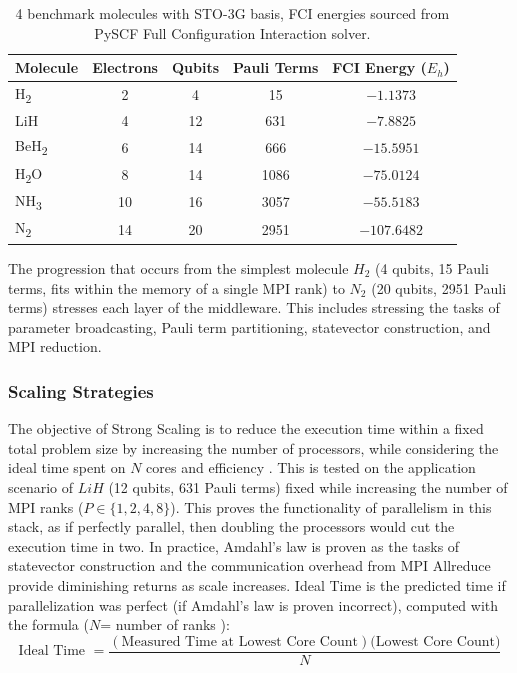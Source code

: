 \begin{table}[htbp]
\centering
\renewcommand{\arraystretch}{1.2}
\begin{tabular}{|l|c|c|c|c|}
\hline
\textbf{Molecule} & \textbf{Electrons} & \textbf{Qubits} & \textbf{Pauli Terms} & \textbf{FCI Energy ($E_h$)} \\ \hline
H\textsubscript{2} & 2  & 4  & 15   & $-1.1373$ \\ \hline
LiH & 4  & 12 & 631  & $-7.8825$ \\ \hline
BeH\textsubscript{2}  & 6  & 14 & 666  & $-15.5951$ \\ \hline
H\textsubscript{2}O & 8  & 14 & 1086 & $-75.0124$ \\ \hline
NH\textsubscript{3} & 10 & 16 & 3057 & $-55.5183$ \\ \hline
N\textsubscript{2} &14 & 20 & 2951 & $-107.6482$ \\ \hline
\end{tabular}   
\caption{4 benchmark molecules with STO-3G basis, FCI energies sourced from PySCF Full Configuration Interaction solver.}
\label{table:molecules}
\end{table}   

The progression that occurs from the simplest molecule $H_2$ (4 qubits, 15 Pauli terms, fits within the memory of a single MPI 
rank) to $N_{2}$ (20 qubits, 2951 Pauli terms) \parencite{kandala2017hardware} stresses each layer of the middleware. This includes stressing the tasks of parameter broadcasting, 
Pauli term partitioning, statevector construction, and MPI reduction. 


\subsubsection{Scaling Strategies}
The objective of Strong Scaling is to reduce the execution time within a fixed total problem size by increasing the 
number of processors, while considering the ideal time spent on $N$ cores and efficiency \parencite{amdahl1967validity}. This is tested on
the application scenario of $LiH$ (12 qubits, 631 Pauli terms) fixed while increasing the number of MPI ranks ($P \in \{1,2,4,8\}$). This proves the functionality of parallelism in this stack, as if perfectly
parallel, then doubling the processors would cut the execution time in two. In practice, Amdahl's law is proven as the tasks of statevector construction and the communication overhead from MPI Allreduce provide diminishing returns as scale increases. 
Ideal Time is the predicted time if parallelization was perfect (if Amdahl's law is proven incorrect), computed with the formula ($N$= number of ranks \parencite{cuboulderScaling}): 
\begin{equation}
    \text {Ideal Time } = \frac{(\text{Measured Time at Lowest Core Count})\text{(Lowest Core Count)}}{N}
\end{equation}

